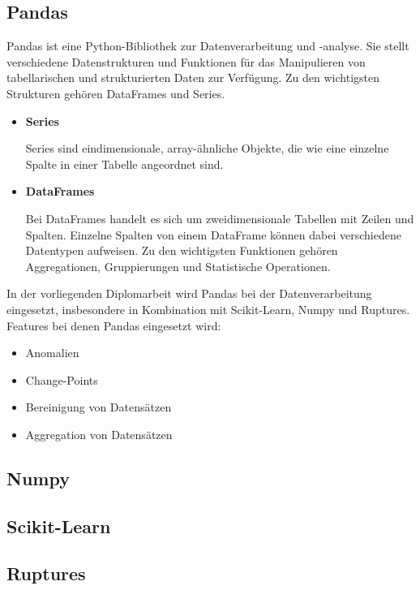 \documentclass{report}
\begin{document}
\subsection{Pandas}
Pandas ist eine Python-Bibliothek zur Datenverarbeitung und -analyse. Sie stellt verschiedene Datenstrukturen und Funktionen für das Manipulieren von tabellarischen und strukturierten Daten zur Verfügung. Zu den wichtigsten Strukturen gehören DataFrames und Series.
\begin{itemize}
    \item \textbf{Series} \\
    \begin{minipage}[t]{\linewidth}
        Series sind eindimensionale, array-ähnliche Objekte, die wie eine einzelne Spalte in einer Tabelle angeordnet sind.
    \end{minipage}

    \item \textbf{DataFrames} \\
    \begin{minipage}[t]{\linewidth}
        Bei DataFrames handelt es sich um zweidimensionale Tabellen mit Zeilen und Spalten. Einzelne Spalten von einem DataFrame können dabei verschiedene Datentypen aufweisen. Zu den wichtigsten Funktionen gehören Aggregationen, Gruppierungen und Statistische Operationen. 
    \end{minipage}
\end{itemize}
  In der vorliegenden Diplomarbeit wird Pandas bei der Datenverarbeitung eingesetzt, insbesondere in Kombination mit Scikit-Learn, Numpy und Ruptures.
  Features bei denen Pandas eingesetzt wird:
  \begin{itemize}
      \item Anomalien
      \item Change-Points
      \item Bereinigung von Datensätzen
      \item Aggregation von Datensätzen
  \end{itemize}




\subsection{Numpy}
\subsection{Scikit-Learn}
\subsection{Ruptures}
\end{document}
